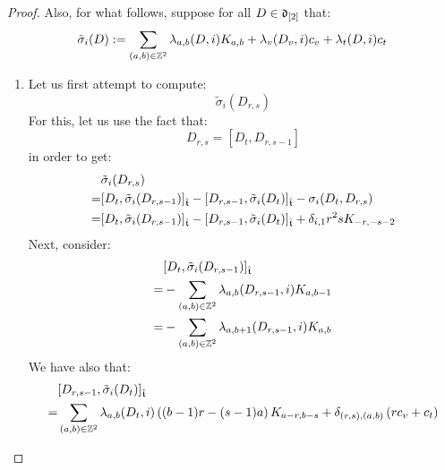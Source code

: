 \begin{proof}
                Also, for what follows, suppose for all $D \in \d_{[2]}$ that:
                    $$\tilde{\sigma}_i(D) := \sum_{(a, b) \in \Z^2} \lambda_{a, b}(D, i) K_{a, b} + \lambda_v(D_v, i) c_v + \lambda_t(D, i) c_t$$
                \begin{enumerate}
                    \item Let us first attempt to compute:
                        $$\tilde{\sigma}_i(D_{r, s})$$
                    For this, let us use the fact that:
                        $$D_{r, s} = [D_t, D_{r, s - 1}]$$
                    in order to get:
                        $$
                            \begin{aligned}
                                & \tilde{\sigma}_i(D_{r, s})
                                \\
                                = & [D_t, \tilde{\sigma}_i(D_{r, s - 1})]_{\extendedtoroidal} - [D_{r, s - 1}, \tilde{\sigma}_i(D_t)]_{\extendedtoroidal} - \sigma_i(D_t, D_{r, s})
                                \\
                                = & [D_t, \tilde{\sigma}_i(D_{r, s - 1})]_{\extendedtoroidal} - [D_{r, s - 1}, \tilde{\sigma}_i(D_t)]_{\extendedtoroidal} + \delta_{i, 1} r^2 s K_{-r, -s - 2}
                            \end{aligned}
                        $$
                    Next, consider:
                        $$
                            \begin{aligned}
                                & [D_t, \tilde{\sigma}_i(D_{r, s - 1})]_{\extendedtoroidal}
                                \\
                                = & -\sum_{(a, b) \in \Z^2} \lambda_{a, b}(D_{r, s - 1}, i) K_{a, b - 1}
                                \\
                                = & -\sum_{(a, b) \in \Z^2} \lambda_{a, b + 1}(D_{r, s - 1}, i) K_{a, b}
                            \end{aligned}
                        $$
                    We have also that:
                        $$
                            \begin{aligned}
                                & [D_{r, s - 1}, \tilde{\sigma}_i(D_t)]_{\extendedtoroidal} 
                                \\
                                = & \sum_{(a, b) \in \Z^2} \lambda_{a, b}(D_t, i) \left( (b - 1)r - (s - 1)a \right) K_{a - r, b - s} + \delta_{(r, s), (a, b)} \left( r c_v + c_t \right)

\end{aligned}$$
\end{enumerate}
\end{proof}
